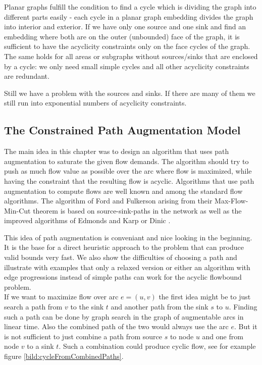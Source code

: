 Planar graphs fulfill the condition to find a 
cycle which is dividing the graph into different parts easily - each cycle in a planar graph embedding divides the 
graph into interior and exterior. If we have only one source and one sink and find an embedding where both are on the 
outer (unbounded) face of the graph, it is sufficient to have the acyclicity constraints only on the face cycles of the 
graph. The same holds for all areas or subgraphs without sources/sinks that are enclosed by a cycle: we only need small 
simple cycles and all other acyclicity constraints are redundant.

Still we have a problem with the sources and sinks. If there are many of them we still run into exponential numbers of 
acyclicity constraints.

\newpage
\subsection{The Constrained Path Augmentation Model}%
\label{model:pathaugment}
The main idea in this chapter was to design an algorithm that uses path augmentation to saturate the given flow 
demands. 
The algorithm should try to push as much flow value as possible over the arc where flow is maximized, while having the 
constraint that the resulting flow is acyclic. %
Algorithms that use path augmentation to compute flows are well known and among the standard flow algorithms. The 
algorithm of Ford and Fulkerson \cite{Ford-Fulkerson_algo} arising from their Max-Flow-Min-Cut theorem is based on 
source-sink-paths in the network as well as the improved algorithms of Edmonds and Karp \cite{EdmondsKarp1972} or Dinic 
\cite{Dinic1970}. 

This idea of path augmentation is conveniant and nice looking in the beginning. It is the base for a direct heuristic 
approach to the problem that can produce valid bounds very fast. We also show the difficulties of choosing a path and 
illustrate with examples that only a relaxed version or either an algorithm with edge progressions instead of simple 
paths can work for the acyclic flowbound problem.\\

If we want to maximize flow over arc $e=(u,v)$ the first idea might be to just search a path from $v$ to the sink $t$ 
and another path from the sink $s$ to $u$. Finding such a path can be done by graph search in the graph of augmentable 
arcs in linear time. Also the combined path of the two would always use the arc $e$.
But it is not sufficient to just combine a path from source $s$ to node 
$u$ and one from node $v$ to a sink $t$. Such a combination could produce cyclic flow, see for example figure 
\ref{bild:cycleFromCombinedPaths}. %

